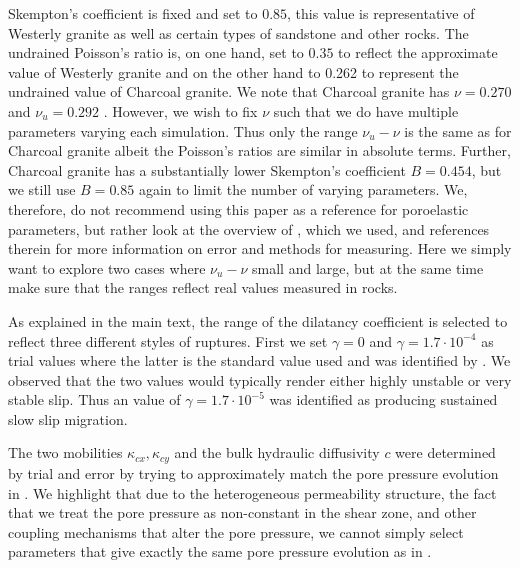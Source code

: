 \documentclass[draft]{agujournal2019}
\begin{document}
Skempton's coefficient is fixed and set to $0.85$, this value is representative of Westerly granite as well as certain types of sandstone and other rocks. The undrained Poisson's ratio is, on one hand, set to $0.35$ to reflect the approximate value of Westerly granite and on the other hand to 0.262 to represent the undrained value of Charcoal granite. We note that Charcoal granite has $\nu = 0.270$ and $\nu_u = 0.292$ \cite{Cheng2016}. However, we wish to fix $\nu$ such that we do have multiple parameters varying each simulation. Thus only the range $\nu_u - \nu$ is the same as for Charcoal granite albeit the Poisson's ratios are similar in absolute terms. Further, Charcoal granite has a substantially lower Skempton's coefficient $B = 0.454$, but we still use $B = 0.85$ again to limit the number of varying parameters. We, therefore, do not recommend using this paper as a reference for poroelastic parameters, but rather look at the overview of , which we used, and references therein for more information on error and methods for measuring. Here we simply want to explore two cases where $\nu_u - \nu$ small and large, but at the same time make sure that the ranges reflect real values measured in rocks.

As explained in the main text, the range of the dilatancy coefficient is selected to reflect three different styles of ruptures. First we set $\gamma = 0$ and $\gamma = 1.7 \cdot 10^{-4}$ as trial values where the latter is the standard value used and was identified by . We observed that the two values would typically render either highly unstable or very stable slip. Thus an value of $\gamma = 1.7 \cdot 10^{-5}$ was identified as producing sustained slow slip migration.

The two mobilities $\kappa_{cx}, \kappa_{cy}$ and the bulk hydraulic diffusivity $c$ were determined by trial and error by trying to approximately match the pore pressure evolution in . We highlight that due to the heterogeneous permeability structure, the fact that we treat the pore pressure as non-constant in the shear zone, and other coupling mechanisms that alter the pore pressure, we cannot simply select parameters that give exactly the same pore pressure evolution as in .
\end{document}
